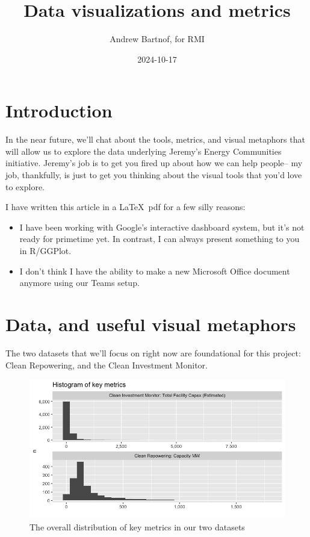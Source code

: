 \documentclass{article}
\title{Data visualizations and metrics}
\date{2024-10-17}
\author{Andrew Bartnof, for RMI}
\begin{document}
  \maketitle

\section{Introduction}

In the near future, we'll chat about the tools, metrics, and visual metaphors that will allow us to explore the data underlying Jeremy's Energy Communities initiative.
Jeremy's job is to get you fired up about how we can help people-- my job, thankfully, is just to get you thinking about the visual tools that you'd love to explore.

I have written this article in a \LaTeX\ pdf for a few silly reasons: 
\begin{itemize}
\item I have been working with Google's interactive dashboard system, but it's not ready for primetime yet. In contrast, I can always present something to you in R/GGPlot.
\item I don't think I have the ability to make a new Microsoft Office document anymore using our Teams setup.
\end{itemize}

\section{Data, and useful visual metaphors}

The two datasets that we'll focus on right now are foundational for this project: Clean Repowering, and the Clean Investment Monitor.
\begin{figure}
  \includegraphics[width=\linewidth]{images/histograms.png}
  \caption{The overall distribution of key metrics in our two datasets}
\end{figure}
\end{document}

